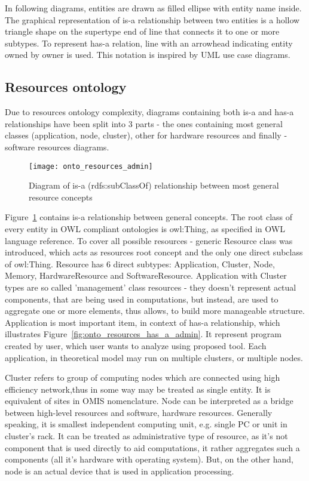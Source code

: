 In following diagrams, entities are drawn as filled ellipse with entity name inside. The graphical representation of
is-a relationship between two entities is a hollow triangle shape on the supertype end of line that connects it to one
or more subtypes. To represent has-a relation, line with an arrowhead indicating entity owned by owner is used. This
notation is inspired by UML use case diagrams.

\pagebreak

\subsection{Resources ontology}
\label{subsec:arch_knowledge_resources}

Due to resources ontology complexity, diagrams containing both is-a and has-a relationships have been split into 3
parts - the ones containing most general classes (application, node, cluster), other for hardware resources and
finally - software resources diagrams.

\begin{figure}[ht]
  \centering
  \texttt{[image: onto\_resources\_admin]}
  \caption{Diagram of is-a (rdfs:subClassOf) relationship between most general resource concepts}
  \label{fig:onto_resources_admin}
\end{figure}



Figure~\ref{fig:onto_resources_admin} contains is-a relationship between general concepts. The root class of every
entity in OWL compliant ontologies is owl:Thing, as specified in OWL language reference\cite{owlRef:2004}. To cover all
possible resources - generic Resource class was introduced, which acts as resources root concept and the only one direct
subclass of owl:Thing. Resource has 6 direct subtypes: Application, Cluster, Node, Memory, HardwareResource and
SoftwareResource. Application with Cluster types are so called 'management' class resources - they doesn't
represent actual components, that are being used in computations, but instead, are used to aggregate one or more
elements, thus allows, to build more manageable structure. Application is most important item, in context of
has-a relationship, which illustrates Figure~\ref{fig:onto_resources_has_a_admin}. It represent program created by
user, which user wants to analyze using proposed tool. Each application, in theoretical model may run on multiple
clusters, or multiple nodes.

Cluster refers to group of computing nodes which are connected using high efficiency
network,thus in some way may be treated as single entity. It is equivalent of sites in OMIS nomenclature\cite{tl9702e}.
Node can be interpreted as a bridge between high-level resources and software, hardware resources. Generally speaking,
it is smallest independent computing unit, e.g. single PC or unit in cluster's rack. It can be treated as administrative
type of resource, as it's not component that is used directly to aid computations, it rather aggregates such a
components (all it's hardware with operating system). But, on the other hand, node is an actual device that is used in
application processing. 

